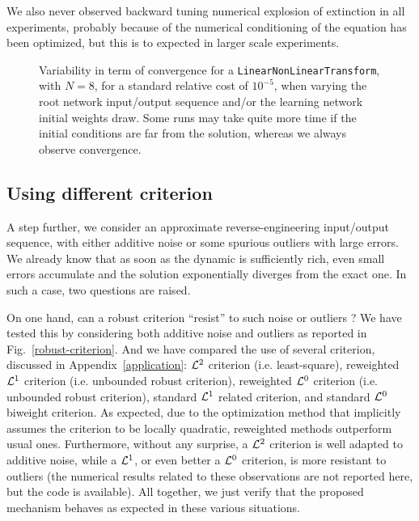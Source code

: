 We also never observed backward tuning numerical explosion of extinction in all experiments, probably because of the numerical conditioning of the equation has been optimized, but this is to expected in larger scale experiments.

\begin{figure}[!ht]
  \begin{center}{\small 
    
  }\end{center}
  \caption{Variability in term of convergence for a {\tt LinearNonLinearTransform}, with $N=8$, for a standard relative cost of $10^{-5}$, when varying the root network input/output sequence and/or the learning network initial weights draw. Some runs may take quite more time if the initial conditions are far from the solution, whereas we always observe convergence.}
  \label{reverse-engineering-variability}
\end{figure}

\subsection*{Using different criterion}

A step further, we consider an approximate reverse-engineering input/output sequence, with either additive noise or some spurious outliers with large errors. We already know that as soon as the dynamic is sufficiently rich, even small errors accumulate and the solution exponentially diverges from the exact one. In such a case, two questions are raised.

On one hand, can a robust criterion ``resist'' to such noise or outliers ? We have tested this by considering both additive noise and outliers as reported in Fig.~\ref{robust-criterion}. And we have compared the use of several criterion, discussed in Appendix~\ref{application}: ${\cal L}^2$ criterion (i.e. least-square), reweighted ${\cal L}^1$ criterion (i.e. unbounded robust criterion), reweighted ${\cal L}^0$ criterion (i.e. unbounded robust criterion), standard ${\cal L}^1$ related criterion, and standard ${\cal L}^0$ biweight criterion. As expected, due to the optimization method that implicitly assumes the criterion to be locally quadratic, reweighted methods outperform usual ones. Furthermore, without any surprise, a ${\cal L}^2$ criterion is well adapted to additive noise, while a ${\cal L}^1$, or even better a ${\cal L}^0$ criterion, is more resistant to outliers (the numerical results related to these observations are not reported here, but the code is available). All together, we just verify that the proposed mechanism behaves as expected in these various situations.


